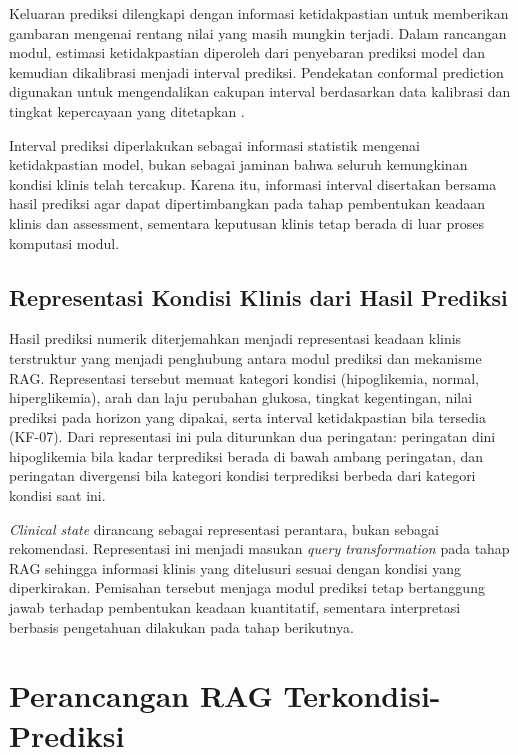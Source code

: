 Keluaran prediksi dilengkapi dengan informasi ketidakpastian untuk memberikan gambaran mengenai rentang nilai yang masih mungkin terjadi. Dalam rancangan modul, estimasi ketidakpastian
diperoleh dari penyebaran prediksi model dan kemudian dikalibrasi menjadi interval prediksi. Pendekatan conformal prediction digunakan untuk mengendalikan cakupan interval berdasarkan
data kalibrasi dan tingkat kepercayaan yang ditetapkan \parencite{angelopoulos2021}.

Interval prediksi diperlakukan sebagai informasi statistik mengenai ketidakpastian model, bukan sebagai jaminan bahwa seluruh kemungkinan kondisi klinis telah tercakup. Karena itu,
informasi interval disertakan bersama hasil prediksi agar dapat dipertimbangkan pada tahap pembentukan keadaan klinis dan assessment, sementara keputusan klinis tetap berada di luar
proses komputasi modul.

\subsection{Representasi Kondisi Klinis dari Hasil Prediksi} 
\label{subsec:bab4-representasi-kondisi-klinis}

Hasil prediksi numerik diterjemahkan menjadi representasi keadaan klinis terstruktur yang menjadi penghubung antara modul prediksi dan mekanisme RAG. Representasi tersebut memuat
kategori kondisi (hipoglikemia, normal, hiperglikemia), arah dan laju perubahan glukosa, tingkat kegentingan, nilai prediksi pada horizon yang dipakai, serta interval
ketidakpastian bila tersedia (KF-07). Dari representasi ini pula diturunkan dua peringatan: peringatan dini hipoglikemia bila kadar terprediksi berada di bawah ambang
peringatan, dan peringatan divergensi bila kategori kondisi terprediksi berbeda dari kategori kondisi saat ini.

\textit{Clinical state} dirancang sebagai representasi perantara, bukan sebagai rekomendasi. Representasi ini menjadi masukan \textit{query transformation} pada tahap RAG
sehingga informasi klinis yang ditelusuri sesuai dengan kondisi yang diperkirakan. Pemisahan tersebut menjaga modul prediksi tetap bertanggung jawab terhadap pembentukan keadaan
kuantitatif, sementara interpretasi berbasis pengetahuan dilakukan pada tahap berikutnya.

\section{Perancangan RAG Terkondisi-Prediksi} 
\label{sec:bab4-perancangan-rag-terkondisi-prediksi}

